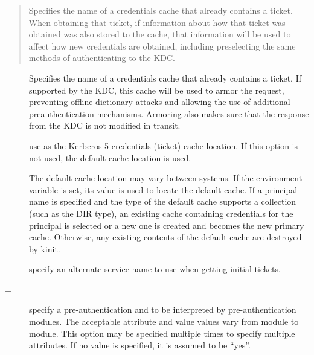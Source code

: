 \documentclass[letterpaper,10pt,english]{sphinxmanual}
\begin{document}
 
\begin{quote}

Specifies the name of a credentials cache that already contains a
ticket.  When obtaining that ticket, if information about how that
ticket was obtained was also stored to the cache, that information
will be used to affect how new credentials are obtained, including
preselecting the same methods of authenticating to the KDC.
\end{quote}
\begin{description}
\item[{ }] \leavevmode
Specifies the name of a credentials cache that already contains a
ticket.  If supported by the KDC, this cache will be used to armor
the request, preventing offline dictionary attacks and allowing
the use of additional preauthentication mechanisms.  Armoring also
makes sure that the response from the KDC is not modified in
transit.

\item[{ }] \leavevmode
use  as the Kerberos 5 credentials (ticket) cache
location.  If this option is not used, the default cache location
is used.

The default cache location may vary between systems.  If the
 environment variable is set, its value is used to
locate the default cache.  If a principal name is specified and
the type of the default cache supports a collection (such as the
DIR type), an existing cache containing credentials for the
principal is selected or a new one is created and becomes the new
primary cache.  Otherwise, any existing contents of the default
cache are destroyed by kinit.

\item[{ }] \leavevmode
specify an alternate service name to use when getting initial
tickets.

\item[{ \sphinxstyleemphasis{attribute}{[}=\sphinxstyleemphasis{value}{]}}] \leavevmode
specify a pre-authentication  and  to be
interpreted by pre-authentication modules.  The acceptable
attribute and value values vary from module to module.  This
option may be specified multiple times to specify multiple
attributes.  If no value is specified, it is assumed to be “yes”.


\end{description}
\end{document}
